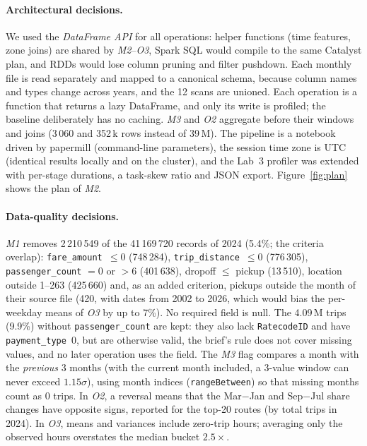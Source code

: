 \documentclass[10pt,a4paper]{article}
\begin{document}
\paragraph{Architectural decisions.} We used the \emph{DataFrame API} for all operations: helper functions (time features, zone joins) are shared by \textit{M2}--\textit{O3}, Spark SQL would compile to the same Catalyst plan, and RDDs would lose column pruning and filter pushdown. Each monthly file is read separately and mapped to a canonical schema, because column names and types change across years, and the 12 scans are unioned. Each operation is a function that returns a lazy DataFrame, and only its write is profiled; the baseline deliberately has no caching. \textit{M3} and \textit{O2} aggregate before their windows and joins (3\,060 and 352\,k rows instead of 39\,M). The pipeline is a notebook driven by papermill (command-line parameters), the session time zone is UTC (identical results locally and on the cluster), and the Lab~3 profiler was extended with per-stage durations, a task-skew ratio and JSON export. Figure~\ref{fig:plan} shows the plan of \textit{M2}.

\paragraph{Data-quality decisions.} \textit{M1} removes 2\,210\,549 of the 41\,169\,720 records of 2024 (5.4\%; the criteria overlap): \texttt{fare\_amount}~$\le 0$ (748\,284), \texttt{trip\_distance}~$\le 0$ (776\,305), \texttt{passenger\_count} $=0$ or $>6$ (401\,638), dropoff $\le$ pickup (13\,510), location outside 1--263 (425\,660) and, as an added criterion, pickups outside the month of their source file (420, with dates from 2002 to 2026, which would bias the per-weekday means of \textit{O3} by up to 7\%). No required field is null. The 4.09\,M trips (9.9\%) without \texttt{passenger\_count} are kept: they also lack \texttt{RatecodeID} and have \texttt{payment\_type}~0, but are otherwise valid, the brief's rule does not cover missing values, and no later operation uses the field. The \textit{M3} flag compares a month with the \emph{previous} 3 months (with the current month included, a 3-value window can never exceed $1.15\sigma$), using month indices (\texttt{rangeBetween}) so that missing months count as 0 trips. In \textit{O2}, a reversal means that the Mar$-$Jan and Sep$-$Jul share changes have opposite signs, reported for the top-20 routes (by total trips in 2024). In \textit{O3}, means and variances include zero-trip hours; averaging only the observed hours overstates the median bucket $2.5\times$.
\end{document}
